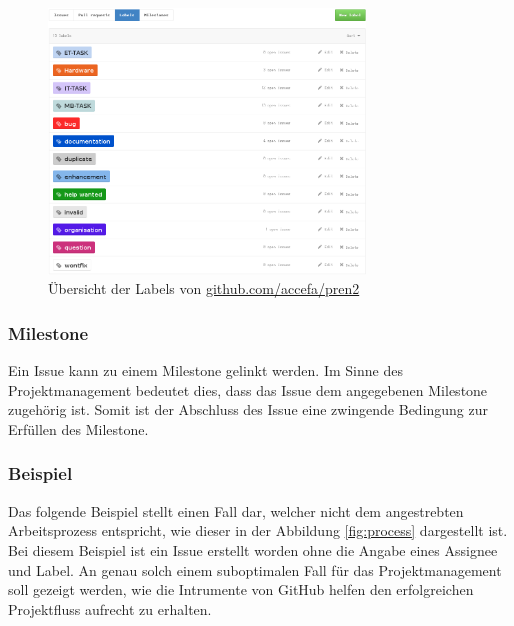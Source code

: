 \begin{figure}[h!]
	\centering
	\includegraphics[width=0.75\textwidth]{../../fig/github/labels.png}
	\caption{Übersicht der Labels von \url{github.com/accefa/pren2}}
	\label{fig:labels}
\end{figure}

\subsubsection{Milestone}
Ein \gls{Issue} kann zu einem \gls{Milestone} gelinkt werden. Im Sinne des
Projektmanagement bedeutet dies, dass das \gls{Issue} dem angegebenen
\gls{Milestone} zugehörig ist. Somit ist der Abschluss des \gls{Issue}
eine zwingende Bedingung zur Erfüllen des \gls{Milestone}.

\clearpage
\subsubsection{Beispiel}
Das folgende Beispiel stellt einen Fall dar, welcher nicht dem angestrebten
Arbeitsprozess entspricht, wie dieser in der Abbildung \ref{fig:process}
dargestellt ist. Bei diesem Beispiel ist ein \gls{Issue} erstellt worden ohne
die Angabe eines \gls{Assignee} und \gls{Label}. An genau solch einem
suboptimalen Fall für das Projektmanagement soll gezeigt werden, wie die
Intrumente von GitHub helfen den erfolgreichen Projektfluss aufrecht zu
erhalten. 

